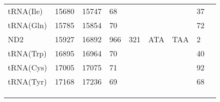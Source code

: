 \documentclass[../DISSERTACAO_MAIN.tex]{subfiles}
\begin{document}
\begin{longtable}{llllllllllllllllllllll}
			tRNA(Ile)    & \multicolumn{2}{l}{15680}   & \multicolumn{2}{l}{15747}   & \multicolumn{2}{l}{68}          & \multicolumn{3}{l}{}                          & \multicolumn{3}{l}{}      & \multicolumn{3}{l}{}        & \multicolumn{3}{l}{37}          & \multicolumn{3}{l}{}         \\
			tRNA(Gln)    & \multicolumn{2}{l}{15785}   & \multicolumn{2}{l}{15854}   & \multicolumn{2}{l}{70}          & \multicolumn{3}{l}{}                          & \multicolumn{3}{l}{}      & \multicolumn{3}{l}{}        & \multicolumn{3}{l}{72}          & \multicolumn{3}{l}{}         \\
			ND2          & \multicolumn{2}{l}{15927}   & \multicolumn{2}{l}{16892}   & \multicolumn{2}{l}{966}         & \multicolumn{3}{l}{321}                       & \multicolumn{3}{l}{ATA}   & \multicolumn{3}{l}{TAA}     & \multicolumn{3}{l}{2}           & \multicolumn{3}{l}{}         \\
			tRNA(Trp)    & \multicolumn{2}{l}{16895}   & \multicolumn{2}{l}{16964}   & \multicolumn{2}{l}{70}          & \multicolumn{3}{l}{}                          & \multicolumn{3}{l}{}      & \multicolumn{3}{l}{}        & \multicolumn{3}{l}{40}          & \multicolumn{3}{l}{}         \\
			tRNA(Cys)    & \multicolumn{2}{l}{17005}   & \multicolumn{2}{l}{17075}   & \multicolumn{2}{l}{71}          & \multicolumn{3}{l}{}                          & \multicolumn{3}{l}{}      & \multicolumn{3}{l}{}        & \multicolumn{3}{l}{92}          & \multicolumn{3}{l}{}         \\
			tRNA(Tyr)    & \multicolumn{2}{l}{17168}   & \multicolumn{2}{l}{17236}   & \multicolumn{2}{l}{69}          & \multicolumn{3}{l}{}                          & \multicolumn{3}{l}{}      & \multicolumn{3}{l}{}        & \multicolumn{3}{l}{68}          & \multicolumn{3}{l}{}         \\
			& \multicolumn{2}{l}{}        & \multicolumn{2}{l}{}        & \multicolumn{2}{l}{}            & \multicolumn{3}{l}{}                          & \multicolumn{3}{l}{}      & \multicolumn{3}{l}{}        & \multicolumn{3}{l}{}            & \multicolumn{3}{l}{}         \\
			& \multicolumn{2}{l}{}        & \multicolumn{2}{l}{}        & \multicolumn{2}{l}{}            & \multicolumn{3}{l}{}                          & \multicolumn{3}{l}{}      & \multicolumn{3}{l}{}        & \multicolumn{3}{l}{}            & \multicolumn{3}{l}{}         \\
			& \multicolumn{2}{l}{}        & \multicolumn{2}{l}{}        & \multicolumn{2}{l}{}            & \multicolumn{3}{l}{}                          & \multicolumn{3}{l}{}      & \multicolumn{3}{l}{}        & \multicolumn{3}{l}{}            & \multicolumn{3}{l}{}         \\

\end{longtable}
\end{document}
